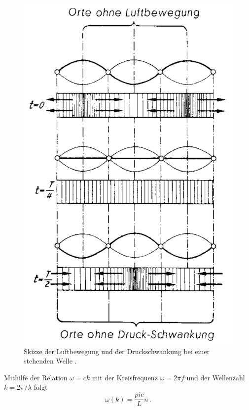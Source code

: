 \begin{figure}
  \centering
  \includegraphics[width=\textwidth]{data/stehendeWelle.png}
  \caption{Skizze der Luftbewegung und der Druckschwankung bei einer stehenden Welle \cite{stehendeWelle}.}
  \label{fig:stehendeWelle}
\end{figure}

Mithilfe der Relation $\omega = ck$ mit der Kreisfrequenz $\omega = 2 \pi f$ und der Wellenzahl $k = 2 \pi / \lambda$ folgt
\begin{equation}
  \omega(k) = \frac{pi c}{L} n\,.
  \label{eqn:dispersionKlassisch}
\end{equation}

